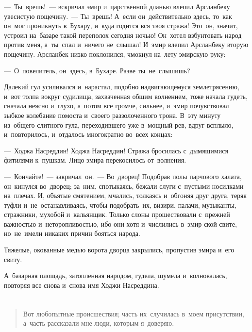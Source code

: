 \documentclass[12pt,a4paper]{book}
\begin{document}
—~Ты~врешь!~— вскричал эмир и~царственной дланью влепил Арсланбеку увесистую пощечину.~— Ты~врешь! А~если он~действительно здесь, то~как он~мог проникнуть в~Бухару, и~куда годится вся твоя стража! Это~он, значит, устроил на~базаре такой переполох сегодня ночью! Он~хотел взбунтовать народ против меня, а~ты~спал и~ничего не~слышал! И~эмир влепил Арсланбеку вторую пощечину. Арсланбек низко поклонился, чмокнул на~лету эмирскую руку:

—~О~повелитель, он~здесь, в~Бухаре. Разве ты~не~слышишь?

Далекий гул усиливался и~нарастал, подобно надвигающемуся землетрясению, и~вот толпа вокруг судилища, захваченная общим волнением, тоже начала гудеть, сначала неясно и~глухо, а~потом все громче, сильнее, и~эмир почувствовал зыбкое колебание помоста и~своего раззолоченного трона. В~эту минуту из~общего слитного гула, переходившего уже в~мощный рев, вдруг всплыло, и~повторилось, и~отдалось многократно во~всех концах:

—~Ходжа Насреддин! Ходжа Насреддин! Стража бросилась с~дымящимися фитилями к~пушкам. Лицо эмира перекосилось от~волнения.

—~Кончайте!~— закричал~он.~— Во~дворец! Подобрав полы парчового халата, он~кинулся во~дворец; за~ним, спотыкаясь, бежали слуги с~пустыми носилками на~плечах. И, объятые смятением, мчались, толкаясь и~обгоняя друг друга, теряя туфли и~не~останавливаясь, чтобы подобрать~их, визири, палачи, музыканты, стражники, мухобой и~кальянщик. Только слоны прошествовали с~прежней важностью и~неторопливостью, ибо они хотя и~числились в~эмир-ской свите, но~не~имели никаких причин бояться народа.

Тяжелые, окованные медью ворота дворца закрылись, пропустив эмира и~его свиту.

А~базарная площадь, затопленная народом, гудела, шумела и~волновалась, повторяя все снова и~снова имя Ходжи Насреддина.


\part{}

\begin{quote}
Вот любопытные происшествия; часть их~случилась в~моем присутствии, а~часть рассказали мне люди, которым я~доверяю.
\end{quote}

\chapter{}
\end{document}
